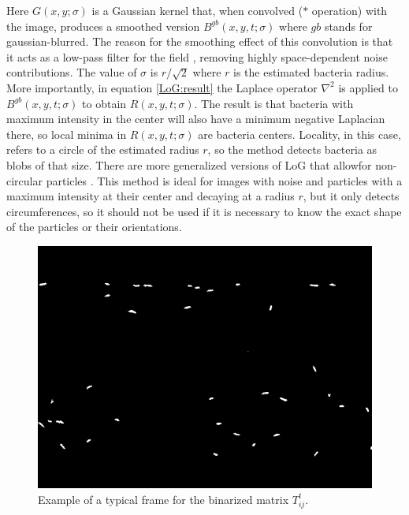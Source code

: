 Here $G(x,y;\sigma)$ is a Gaussian kernel that, when convolved ($*$ operation) with the image, produces a smoothed version $B^{gb}(x,y,t;\sigma)$ where $gb$ stands for gaussian-blurred. The reason for the smoothing effect of this convolution is that it acts as a low-pass filter for the field \cite{WaltzaAnMachines}, removing highly space-dependent noise contributions. The value of $\sigma$ is $r/\sqrt{2}$ where $r$ is the estimated bacteria radius. More importantly, in equation \eqref{LoG:result} the Laplace operator $\nabla^2$ is applied to $B^{gb}(x,y,t;\sigma)$ to obtain $R(x,y,t;\sigma)$. The result is that bacteria with maximum intensity in the center will also have a minimum negative Laplacian there, so local minima in $R(x,y,t;\sigma)$ are bacteria centers. Locality, in this case, refers to a circle of the estimated radius $r$, so the method detects bacteria as blobs of that size. There are more generalized versions of LoG that allowfor non-circular particles \cite{Kong2013AApplications}. This method is ideal for images with noise and particles with a maximum intensity at their center and decaying at a radius $r$, but it only detects circumferences, so it should not be used if it is necessary to know the exact shape of the particles or their orientations.

\begin{figure}

\centering
\includegraphics[width=\linewidth,angle=0]{imagenes/track_video_frame.PNG}
\caption[Tracking video frame]{Example of a typical frame for the binarized matrix $T_{ij}^t$.}
\label{tracking_video_frame}
\vspace{-20pt}
\end{figure}


